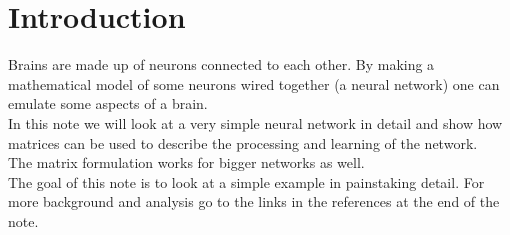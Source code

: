 \documentclass{article}
\title{\normalfont{Back propagation in a simple neural net}}
\author{HappyDustbunny}
\begin{document}
\maketitle
\section*{Introduction}
Brains are made up of neurons connected to each other. By making a mathematical model of some neurons wired together (a neural network) one can emulate some aspects of a brain.
\\
In this note we will look at a very simple neural network in detail and show how matrices can be used to describe the processing and learning of the network.
\\The matrix formulation works for bigger networks as well.
\\
The goal of this note is to look at a simple example in painstaking detail. For more background and analysis go to the links in the references at the end of the note. \cite{Mazur}
\\
\\
\end{document}

